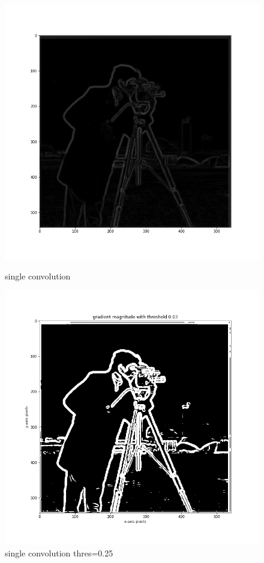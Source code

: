 \documentclass{article}
\begin{document}
\begin{figure}[!htb]
    \includegraphics[width=\linewidth]{single convolution.png}
    \caption{single convolution}\label{fig:awesome_image1}
\endminipage
{}
    \includegraphics[width=\linewidth]{single convolution with threshold.png}
    \caption{single convolution thres=0.25}\label{fig:awesome_image2}
\endminipage
\end{figure}
\FloatBarrier
\end{document}
